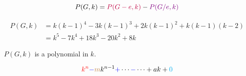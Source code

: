 \begin{frame}{}
	\[
		P(G, k) = \textcolor{purple}{P(G - e, k)} - \textcolor{violet}{P(G / e, k)}
	\]


	\pause
	\vspace{-0.30cm}
	\begin{align*}
		P(G, k) &= k(k-1)^4 - 3k(k-1)^3 + 2k(k-1)^2 + k(k-1)(k-2) \\
		        &= k^5 - 7k^4 + 18k^3 - 20k^2 + 8k
	\end{align*}

	\pause
	\begin{theorem}
		$P(G, k)$ is a polynomial in $k$.
	\end{theorem}

	\pause
	\vspace{-0.30cm}
	\[
		\textcolor{red}{k^n} \textcolor{blue}{-} \textcolor{brown}{m} k^{n - 1} \textcolor{blue}{+}
		  \cdots \textcolor{blue}{-} \cdots + ak + \textcolor{cyan}{0}
	\]
\end{frame}
